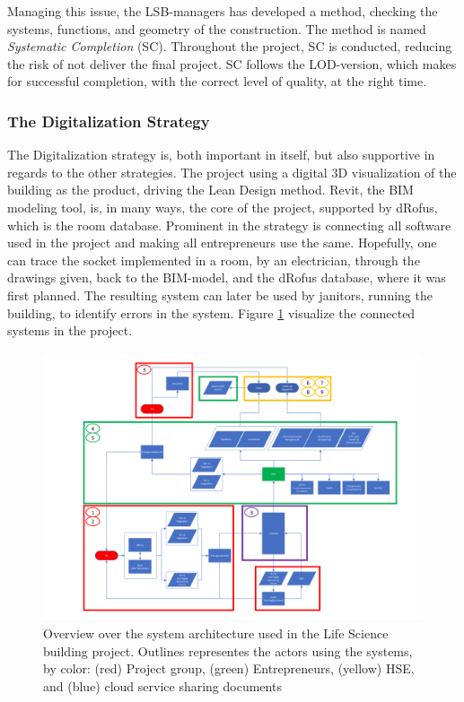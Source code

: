 Managing this issue, the LSB-managers has developed a method, checking the systems, functions, and geometry of the construction. The method is named \textit{Systematic Completion} (SC). Throughout the project, SC is conducted, reducing the risk of not deliver the final project. SC follows the LOD-version, which makes for successful completion, with the correct level of quality, at the right time.

\subsubsection*{The Digitalization Strategy}
The Digitalization strategy is, both important in itself, but also supportive in regards to the other strategies. The project using a digital 3D visualization of the building as the product, driving the Lean Design method. Revit, the BIM modeling tool, is, in many ways, the core of the project, supported by dRofus, which is the room database. Prominent in the strategy is connecting all software used in the project and making all entrepreneurs use the same. Hopefully, one can trace the socket implemented in a room, by an electrician, through the drawings given, back to the BIM-model, and the dRofus database, where it was first planned. The resulting system can later be used by janitors, running the building, to identify errors in the system.  Figure \ref{fig:LSB_systems} visualize the connected systems in the project.

\begin{figure}
    \centering
    \includegraphics[width=\textwidth]{fig/LVB_system-arkitektur.png}
    \caption{Overview over the system architecture used in the Life Science building project. Outlines representes the actors using the systems, by color: (red) Project group, (green) Entrepreneurs, (yellow) HSE, and (blue) cloud service sharing documents}
    \label{fig:LSB_systems}
\end{figure}

